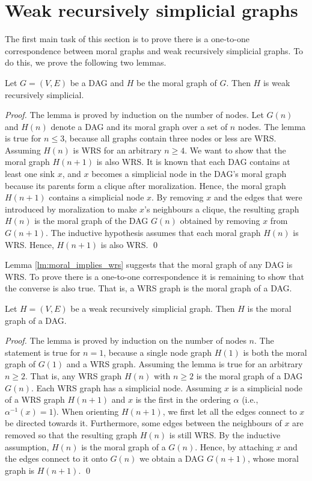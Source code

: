 \section{Weak recursively simplicial graphs}
The first main task of this section is to prove there is a one-to-one correspondence between moral graphs and weak recursively simplicial graphs. To do this, we prove the following two lemmas. 

\begin{lemma}
\label{lm:moral_implies_wrs}
Let $G=(V,E)$ be a DAG and $H$ be the moral graph of $G$. Then $H$ is weak recursively simplicial. 
\end{lemma}

\begin{proof}
The lemma is proved by induction on the number of nodes. Let $G(n)$ and $H(n)$ denote a DAG and its moral graph over a set of $n$ nodes. The lemma is true for $n \le 3$, because all graphs contain three nodes or less are WRS. Assuming $H(n)$ is WRS for an arbitrary $n \ge 4$. We want to show that the moral graph $H(n+1)$ is also WRS. It is known that each DAG contains at least one sink $x$, and $x$ becomes a simplicial node in the DAG's moral graph because its parents form a clique after moralization. Hence, the moral graph $H(n+1)$ contains a simplicial node $x$. By removing $x$ and the edges that were introduced by moralization to make $x$'s neighbours a clique, the resulting graph $H(n)$ is the moral graph of the DAG $G(n)$ obtained by removing $x$ from $G(n+1)$. The inductive hypothesis assumes that each moral graph $H(n)$ is WRS. Hence, $H(n+1)$ is also WRS. \qed
\end{proof}
Lemma \ref{lm:moral_implies_wrs} suggests that the moral graph of any DAG is WRS. To prove there is a one-to-one correspondence it is remaining to show that the converse is also true. That is, a WRS graph is the moral graph of a DAG. 

\begin{lemma}
\label{lm:wrs_implies_moral}
Let $H=(V,E)$ be a weak recursively simplicial graph. Then $H$ is the moral graph of a DAG. 
\end{lemma}

\begin{proof}
The lemma is proved by induction on the number of nodes $n$. The statement is true for $n=1$, because a single node graph $H(1)$ is both the moral graph of $G(1)$ and a WRS graph. Assuming the lemma is true for an arbitrary $n\ge 2$. That is, any WRS graph $H(n)$ with $n\ge 2$ is the moral graph of a DAG $G(n)$. Each WRS graph has a simplicial node. Assuming $x$ is a simplicial node of a WRS graph $H(n+1)$ and $x$ is the first in the ordering $\alpha$ (i.e., $\alpha^{-1}(x)=1$). When orienting $H(n+1)$, we first let all the edges connect to $x$ be directed towards it. Furthermore, some edges between the neighbours of $x$ are removed so that the resulting graph $H(n)$ is still WRS. By the inductive assumption, $H(n)$ is the moral graph of a $G(n)$. Hence, by attaching $x$ and the edges connect to it onto $G(n)$ we obtain a DAG $G(n+1)$, whose moral graph is $H(n+1)$. \qed
\end{proof}

